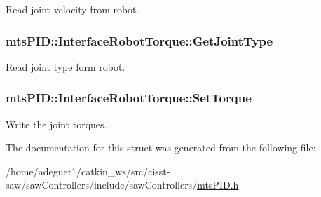 Read joint velocity from robot. 

\hypertarget{structmts_p_i_d_1_1_interface_robot_torque_aa8d665775f11c3a1b25340727efe2d0c}{
\subsubsection[{Get\-Joint\-Type}]{ mts\-P\-I\-D\-::\-Interface\-Robot\-Torque\-::\-Get\-Joint\-Type}}\label{structmts_p_i_d_1_1_interface_robot_torque_aa8d665775f11c3a1b25340727efe2d0c}


Read joint type form robot. 

\hypertarget{structmts_p_i_d_1_1_interface_robot_torque_a05317acc6fa8b2e125d2a6c3f5d55f86}{
\subsubsection[{Set\-Torque}]{ mts\-P\-I\-D\-::\-Interface\-Robot\-Torque\-::\-Set\-Torque}}\label{structmts_p_i_d_1_1_interface_robot_torque_a05317acc6fa8b2e125d2a6c3f5d55f86}


Write the joint torques. 



The documentation for this struct was generated from the following file\-:\begin{DoxyCompactItemize}
\item 
/home/adeguet1/catkin\-\_\-ws/src/cisst-\/saw/saw\-Controllers/include/saw\-Controllers/\hyperlink{mts_p_i_d_8h}{mts\-P\-I\-D.\-h}\end{DoxyCompactItemize}
